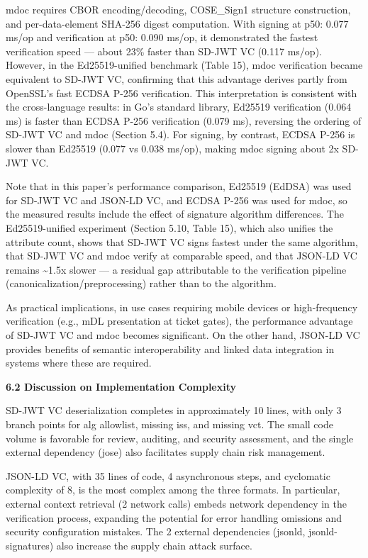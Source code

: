 mdoc requires CBOR encoding/decoding, COSE\_Sign1 structure construction, and per-data-element SHA-256 digest computation. With signing at p50: 0.077 ms/op and verification at p50: 0.090 ms/op, it demonstrated the fastest verification speed --- about 23\% faster than SD-JWT VC (0.117 ms/op). However, in the Ed25519-unified benchmark (Table 15), mdoc verification became equivalent to SD-JWT VC, confirming that this advantage derives partly from OpenSSL's fast ECDSA P-256 verification. This interpretation is consistent with the cross-language results: in Go's standard library, Ed25519 verification (0.064 ms) is faster than ECDSA P-256 verification (0.079 ms), reversing the ordering of SD-JWT VC and mdoc (Section 5.4). For signing, by contrast, ECDSA P-256 is slower than Ed25519 (0.077 vs 0.038 ms/op), making mdoc signing about 2x SD-JWT VC.

Note that in this paper's performance comparison, Ed25519 (EdDSA) was used for SD-JWT VC and JSON-LD VC, and ECDSA P-256 was used for mdoc, so the measured results include the effect of signature algorithm differences. The Ed25519-unified experiment (Section 5.10, Table 15), which also unifies the attribute count, shows that SD-JWT VC signs fastest under the same algorithm, that SD-JWT VC and mdoc verify at comparable speed, and that JSON-LD VC remains \textasciitilde1.5x slower --- a residual gap attributable to the verification pipeline (canonicalization/preprocessing) rather than to the algorithm.

As practical implications, in use cases requiring mobile devices or high-frequency verification (e.g., mDL presentation at ticket gates), the performance advantage of SD-JWT VC and mdoc becomes significant. On the other hand, JSON-LD VC provides benefits of semantic interoperability and linked data integration in systems where these are required.

\textbf{6.2 Discussion on Implementation Complexity}

SD-JWT VC deserialization completes in approximately 10 lines, with only 3 branch points for alg allowlist, missing iss, and missing vct. The small code volume is favorable for review, auditing, and security assessment, and the single external dependency (jose) also facilitates supply chain risk management.

JSON-LD VC, with 35 lines of code, 4 asynchronous steps, and cyclomatic complexity of 8, is the most complex among the three formats. In particular, external context retrieval (2 network calls) embeds network dependency in the verification process, expanding the potential for error handling omissions and security configuration mistakes. The 2 external dependencies (jsonld, jsonld-signatures) also increase the supply chain attack surface.

